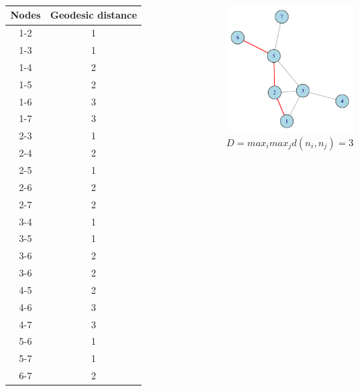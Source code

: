 \documentclass[8pt]{beamer}
\begin{document}

\begin{frame}
\frametitle{\insertsection}
\framesubtitle{\insertsubsection}

\begin{columns}

\footnotesize
\centering
\begin{tabular}{cc}
\toprule
Nodes & Geodesic distance\\
\hline
1-2 & 1\\
1-3 & 1\\
1-4 & 2\\
1-5 & 2\\
1-6 & 3\\
1-7 & 3\\
2-3 & 1\\
2-4 & 2\\
2-5 & 1\\
2-6 & 2\\
2-7 & 2\\
3-4 & 1\\
3-5 & 1\\
3-6 & 2\\
3-6 & 2\\
4-5 & 2\\
4-6 & 3\\
4-7 & 3\\
5-6 & 1\\
5-7 & 1\\
6-7 & 2\\
\bottomrule
\end{tabular}


\centering
\begin{overprint}
\includegraphics[width=5cm]{diameter}\\
            $D=max_i max_j d(n_i,n_j)=3$
\end{overprint}
            
\end{columns}

\end{frame}
\end{document}
